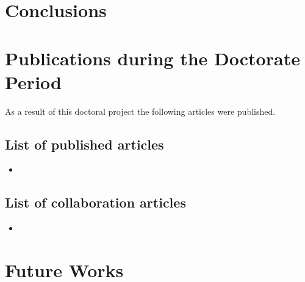 \section{Conclusions}

\section{Publications during the Doctorate Period}

As a result of this doctoral project the following articles were published.
\subsection{List of published articles}
\begin{itemize}
	\item \begin{NoHyper} \end{NoHyper}
\end{itemize}

\subsection{List of collaboration articles}
\begin{itemize}
	\item {} 
\end{itemize}

\section{Future Works}
%
